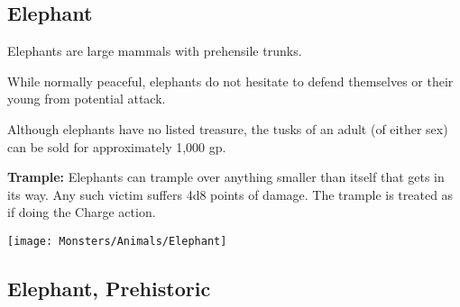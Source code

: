 \begin{multicols*}{2}
\subsection{Elephant}\label{monster:Elephant}

Elephants are large mammals with prehensile trunks.

While normally peaceful, elephants do not hesitate to defend themselves or their young from potential attack.

Although elephants have no listed treasure, the tusks of an adult (of either sex) can be sold for approximately 1,000 gp.

\textbf{Trample:} Elephants can trample over anything smaller than itself that gets in its way. Any such victim suffers 4d8 points of damage. The trample is treated as if doing the Charge action.

\texttt{[image: Monsters/Animals/Elephant]}

\subsection{Elephant, Prehistoric}
\end{multicols*}
